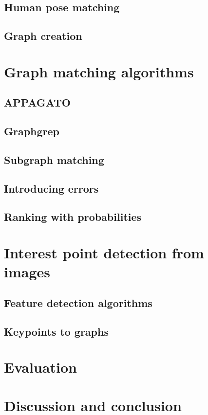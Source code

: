 \documentclass{article}
\begin{document}
\subsection{Human pose matching}

\subsection{Graph creation}

\section{Graph matching algorithms}

\subsection{APPAGATO}

\subsection{Graphgrep}

\subsection{Subgraph matching}

\subsection{Introducing errors}

\subsection{Ranking with probabilities}



\section{Interest point detection from images}

\subsection{Feature detection algorithms}

\subsection{Keypoints to graphs}

\section{Evaluation}

\section{Discussion and conclusion}
\end{document}
